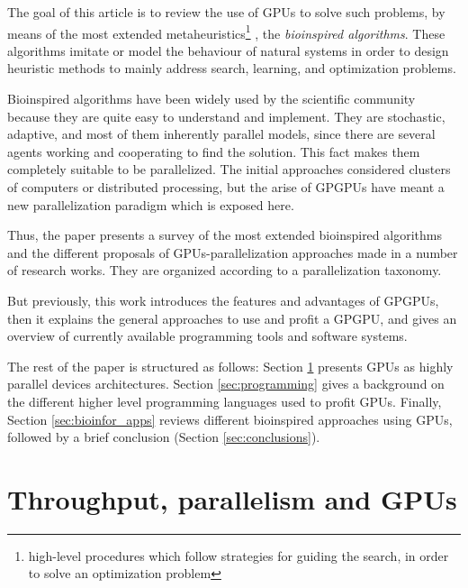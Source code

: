 \documentclass{comjnl}
\begin{document}
The goal of this article is to review the use of GPUs to solve such
problems, by means of the most extended
metaheuristics\footnote{high-level procedures which follow strategies
  for guiding the search, in order to solve an optimization problem} %
, the \textit{bioinspired algorithms}. These algorithms imitate or
model the behaviour of natural systems in order to design heuristic
methods to mainly address search, learning, and optimization
problems. %

Bioinspired algorithms have been widely used by the scientific community because they are quite easy to understand and implement.
They are stochastic, adaptive, and most of them inherently parallel models, since there are several agents working and cooperating to find the solution. This fact makes them completely suitable to be parallelized. The initial approaches considered clusters of computers or distributed processing, but the arise of GPGPUs have meant a new parallelization paradigm which is exposed here.

Thus, the paper presents a survey of the most extended bioinspired algorithms and the different proposals of GPUs-parallelization approaches made in a number of research works. They are organized according to a parallelization taxonomy.

But previously, this work introduces the features and advantages of GPGPUs, then it explains the general approaches to use and profit a GPGPU, and gives an overview of currently available programming tools and software systems.

The rest of the paper is structured as follows: Section \ref{sec:parall_and_GPUs} presents GPUs as highly parallel devices architectures.
Section \ref{sec:programming} gives a background on the different
higher level programming languages used to profit GPUs. Finally,
Section \ref{sec:bioinfor_apps} reviews different bioinspired
approaches using GPUs, followed by a brief conclusion (Section
\ref{sec:conclusions}). 

\section{Throughput, parallelism and GPUs}
\label{sec:parall_and_GPUs}
\end{document}
